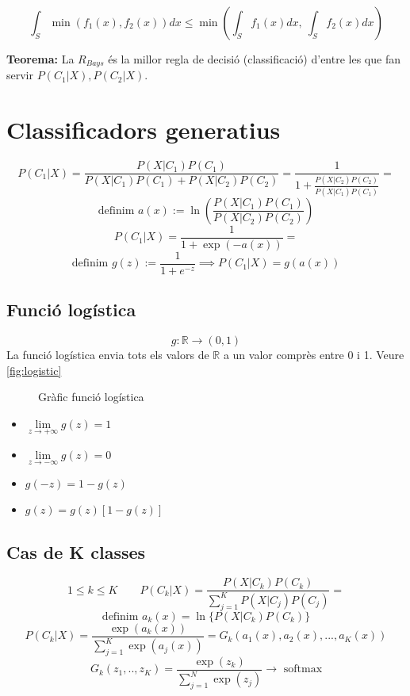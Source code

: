 \documentclass[a4paper]{article}
\begin{document}
$$
\int_S \min(f_1(x), f_2(x)) dx \le \min\left( \int_S f_1(x) dx,\ \int_S f_2(x) dx \right)
$$


\textbf{Teorema:} La $R_{Bays}$ és la millor regla de decisió (classificació) d'entre les que fan servir $P(C_1|X), P(C_2|X)$.

\section{Classificadors generatius}

$$
P(C_1|X) = \frac{P(X|C_1)P(C_1)}{P(X|C_1)P(C_1) + P(X|C_2)P(C_2)} = 
\frac{1}{1 + \frac{P(X|C_2)P(C_2)}{P(X|C_1)P(C_1)}} =
$$
$$
\text{definim } a(x) := \ln \left( \frac{P(X|C_1)P(C_1)}{P(X|C_2)P(C_2)} \right)
$$
$$
P(C_1|X) = \frac{1}{1 + \exp(-a(x))} = 
$$
$$
\text{definim } g(z) := \frac{1}{1 + e^{-z}} \implies P(C_1|X) = g(a(x))
$$


\subsection{Funció logística}

$$
g:\mathbb{R} \rightarrow (0,1)
$$
La funció logística envia tots els valors de $\mathbb{R}$ a un valor comprès entre 0 i 1. Veure \autoref{fig:logistic}

\begin{figure}[H]
	\centering
	\caption{Gràfic funció logística}
	\label{fig:logistic}
\end{figure}

\begin{itemize}
	\item $ \lim\limits_{z \to +\infty} g(z) = 1 $
	\item $ \lim\limits_{z \to -\infty} g(z) = 0 $
	\item $ g(-z) = 1 - g(z) $
	\item $ g(z) = g(z)[1 - g(z)] $
\end{itemize}

\subsection{Cas de K classes}
$$
1 \le k \le K \qquad P(C_k | X) = \frac{P(X|C_k)P(C_k)}{\sum_{j=1}^K P(X|C_j)P(C_j)} =
$$
$$
\text{definim } a_k(x) = \ln\{P(X|C_k)P(C_k)\}
$$
$$
P(C_k|X) = \frac{\exp(a_k(x))}{\sum_{j=1}^K \exp(a_j(x))} = G_k (a_1(x), a_2(x),...,a_K(x))
$$
$$
G_k(z_1,..,z_K) = \frac{\exp(z_k)}{\sum_{j=1}^N \exp(z_j)} \longrightarrow \text{ softmax}
$$
\end{document}
